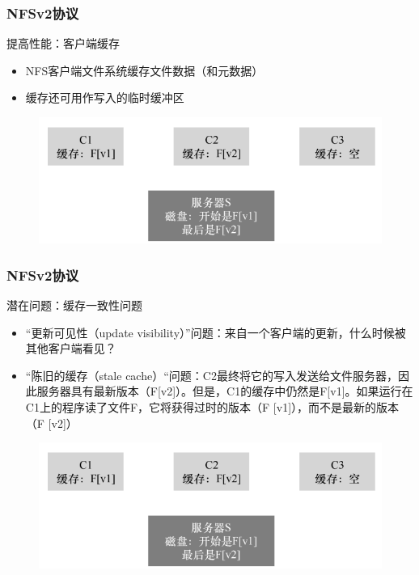\begin{frame}[fragile]
    \frametitle{NFSv2协议}
    提高性能：客户端缓存
    
    \begin{itemize}
        \item NFS客户端文件系统缓存文件数据（和元数据）
        \item 缓存还可用作写入的临时缓冲区
    \end{itemize}

        \begin{figure}
            \includegraphics[width=0.7\linewidth]{figs/nfsv2-cache.png}
        \end{figure}
    
\end{frame}

\begin{frame}[fragile]
    \frametitle{NFSv2协议}
    潜在问题：缓存一致性问题
    
    \begin{itemize}
        \item “更新可见性（update visibility）”问题：来自一个客户端的更新，什么时候被其他客户端看见？
        \item “陈旧的缓存（stale cache）“问题：C2最终将它的写入发送给文件服务器，因此服务器具有最新版本（F[v2]）。但是，C1的缓存中仍然是F[v1]。如果运行在C1上的程序读了文件F，它将获得过时的版本（F [v1]），而不是最新的版本（F [v2]）
    \end{itemize}
    
    \begin{figure}
        \includegraphics[width=0.5\linewidth]{figs/nfsv2-cache.png}
    \end{figure}
    
\end{frame}


